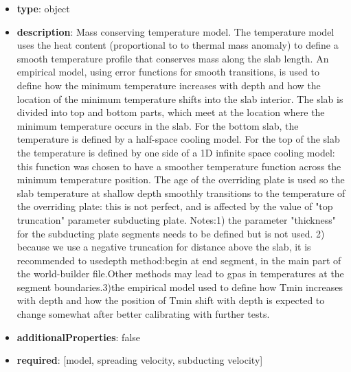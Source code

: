 \begin{itemize}[leftmargin=6em]\item {\bf type}: object
\item {\bf description}: Mass conserving temperature model. The temperature model uses the heat content (proportional to to thermal mass anomaly) to define a smooth temperature profile that conserves mass along the slab length. An empirical model, using error functions for smooth transitions, is used to  define how the minimum temperature increases with depth and how the location of the minimum temperature shifts into the slab interior. The slab is divided into top and bottom parts, which meet at the location where the minimum temperature occurs in the slab. For the bottom slab, the temperature is defined by a half-space cooling model. For the top of the slab the temperature is defined by one side of a 1D infinite space cooling model: this function was chosen to have a smoother temperature function across the minimum temperature position. The age of the overriding plate is used so the slab temperature at shallow depth smoothly transitions to the temperature of the overriding plate: this is not perfect, and is affected by the value of "top truncation" parameter subducting plate. Notes:1) the parameter "thickness" for the subducting plate segments needs to be defined but is not used. 2) because we use a negative truncation for distance above the slab, it is recommended to usedepth method:begin at end segment, in the main part of the world-builder file.Other methods may lead to gpas in temperatures at the segment boundaries.3)the empirical model used to define how Tmin increases with depth and how the position of Tmin shift with depth is expected to change somewhat after better calibrating with further tests.
\item {\bf additionalProperties}: false
\item {\bf required}: [model, spreading velocity, subducting velocity]\end{itemize}
